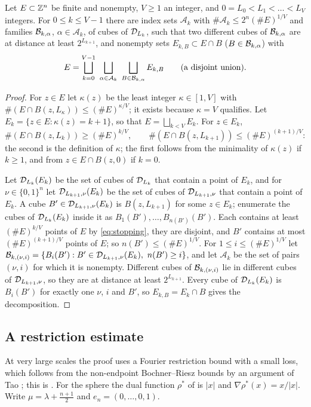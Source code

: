 \begin{lemma}\label{lem:stopping}
Let $E\subset\mathbb{Z}^n$ be finite and nonempty, $V\ge1$ an integer, and $0=L_0<L_1<\dots<L_V$ integers. For
$0\le k\le V-1$ there are index sets $\mathcal A_k$ with $\#\mathcal A_k\le2^n(\#E)^{1/V}$ and families
$\mathcal B_{k,\alpha}$, $\alpha\in\mathcal A_k$, of cubes of $\mathcal D_{L_k}$, such that two different cubes of $\mathcal B_{k,\alpha}$ are at
distance at least $2^{L_{k+1}}$, and nonempty sets $E_{k,B}\subset E\cap B$ ($B\in\mathcal B_{k,\alpha}$) with
\[
E=\bigsqcup_{k=0}^{V-1}\ \bigsqcup_{\alpha\in\mathcal A_k}\ \bigsqcup_{B\in\cB_{k,\alpha}}E_{k,B}
\qquad\text{(a disjoint union).}
\]
\end{lemma}

\begin{proof}
For $z\in E$ let $\kappa(z)$ be the least integer $\kappa\in[1,V]$ with
$\#(E\cap B(z,L_\kappa))\le(\#E)^{\kappa/V}$; it exists because $\kappa=V$ qualifies. Let
$E_k=\{z\in E:\kappa(z)=k+1\}$, so that $E=\bigsqcup_{k<V}E_k$. For $z\in E_k$,
\begin{equation}\label{eq:stopping}
\#(E\cap B(z,L_k))\ge(\#E)^{k/V},\qquad\#(E\cap B(z,L_{k+1}))\le(\#E)^{(k+1)/V}:
\end{equation}
the second is the definition of $\kappa$; the first follows from the minimality of $\kappa(z)$ if $k\ge1$, and
from $z\in E\cap B(z,0)$ if $k=0$.

Let $\mathcal D_{L_k}(E_k)$ be the set of cubes of $\mathcal D_{L_k}$ that contain a point of $E_k$, and for $\nu\in\{0,1\}^n$
let $\mathcal D_{L_{k+1},\nu}(E_k)$ be the set of cubes of $\mathcal D_{L_{k+1},\nu}$ that contain a point of $E_k$. A cube
$B'\in\mathcal D_{L_{k+1},\nu}(E_k)$ is $B(z,L_{k+1})$ for some $z\in E_k$; enumerate the cubes of $\mathcal D_{L_k}(E_k)$
inside it as $B_1(B'),\dots,B_{n(B')}(B')$. Each contains at least $(\#E)^{k/V}$ points of $E$ by
\eqref{eq:stopping}, they are disjoint, and $B'$ contains at most $(\#E)^{(k+1)/V}$ points of $E$; so
$n(B')\le(\#E)^{1/V}$. For $1\le i\le(\#E)^{1/V}$ let
$\cB_{k,(\nu,i)}=\{B_i(B'):B'\in\D_{L_{k+1},\nu}(E_k),\ n(B')\ge i\}$, and let $\mathcal A_k$ be the set of pairs
$(\nu,i)$ for which it is nonempty. Different cubes of $\mathcal B_{k,(\nu,i)}$ lie in different cubes of
$\mathcal D_{L_{k+1},\nu}$, so they are at distance at least $2^{L_{k+1}}$. Every cube of $\mathcal D_{L_k}(E_k)$ is
$B_i(B')$ for exactly one $\nu$, $i$ and $B'$, so $E_{k,B}=E_k\cap B$ gives the decomposition.
\end{proof}

\subsection{A restriction estimate}\label{ssec:restriction}
At very large scales the proof uses a Fourier restriction bound with a small loss, which follows from the
non-endpoint Bochner--Riesz bounds by an argument of Tao \cite[Theorem 1.1]{Tao99}; this is
\cite[Proposition 6.1]{BRS23}. For the sphere the dual function $\rho^*$ of \cite{BRS23} is $|x|$ and
$\nabla\rho^*(x)=x/|x|$. Write $\mu=\lambda+\frac{n+1}2$ and $e_n=(0,\dots,0,1)$.

